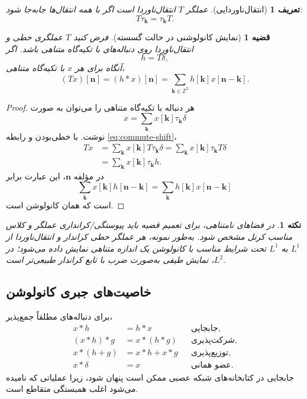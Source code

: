 \documentclass[12pt,openany,oneside]{book}
\newtheorem{definition}{تعریف}[chapter]
\newtheorem{theorem}{قضیه}[chapter]
\newtheorem{remark}{نکته}[chapter]
\newcommand{\Z}{\mathbb{Z}}
\newcommand{\vect}[1]{\bm{#1}}
\begin{document}
\begin{definition}[انتقال‌ناوردایی]
عملگر \(T\) انتقال‌ناوردا است اگر با همه انتقال‌ها جابه‌جا شود:
\begin{equation}
T\tau_{\vect k}=\tau_{\vect k}T.
\label{eq:commute-shift}
\end{equation}
\end{definition}

\begin{theorem}[نمایش کانولوشنی در حالت گسسته]
فرض کنید \(T\) عملگری خطی و انتقال‌ناوردا روی دنباله‌های با تکیه‌گاه متناهی باشد. اگر
\begin{equation}
h=T\delta,
\end{equation}
آنگاه برای هر \(x\) با تکیه‌گاه متناهی،
\begin{equation}
(Tx)[\vect n]=(h*x)[\vect n]
=\sum_{\vect k\in\Z^2}h[\vect k]x[\vect n-\vect k].
\label{eq:lti-convolution}
\end{equation}
\end{theorem}

\begin{proof}
هر دنباله با تکیه‌گاه متناهی را می‌توان به صورت
\begin{equation}
x=\sum_{\vect k}x[\vect k]\tau_{\vect k}\delta
\end{equation}
نوشت. با خطی‌بودن و رابطه \eqref{eq:commute-shift}،
\begin{align}
Tx
&=\sum_{\vect k}x[\vect k]T\tau_{\vect k}\delta
=\sum_{\vect k}x[\vect k]\tau_{\vect k}T\delta\\
&=\sum_{\vect k}x[\vect k]\tau_{\vect k}h.
\end{align}
در مؤلفه \(\vect n\)، این عبارت برابر
\begin{equation}
\sum_{\vect k}x[\vect k]h[\vect n-\vect k]
=\sum_{\vect k}h[\vect k]x[\vect n-\vect k]
\end{equation}
است که همان کانولوشن است.
\end{proof}

\begin{remark}
در فضاهای نامتناهی، برای تعمیم قضیه باید پیوستگی/کرانداری عملگر و کلاس مناسب کرنل مشخص شود.
به‌طور نمونه، هر عملگر خطی کراندار و انتقال‌ناوردا از \(L^1\) به \(L^1\) تحت شرایط مناسب با کانولوشن
یک اندازه متناهی نمایش داده می‌شود؛ در \(L^2\)، نمایش طیفی به‌صورت ضرب با تابع کراندار طبیعی‌تر است.
\end{remark}

\subsection{خاصیت‌های جبری کانولوشن}
برای دنباله‌های مطلقاً جمع‌پذیر،
\begin{align}
x*h&=h*x &&\text{جابجایی},\\
(x*h)*g&=x*(h*g) &&\text{شرکت‌پذیری},\\
x*(h+g)&=x*h+x*g &&\text{توزیع‌پذیری},\\
x*\delta&=x &&\text{عضو همانی}.
\end{align}
جابجایی در کتابخانه‌های شبکه عصبی ممکن است پنهان شود، زیرا عملیاتی که  نامیده می‌شود
اغلب همبستگی متقاطع است.
\end{document}
